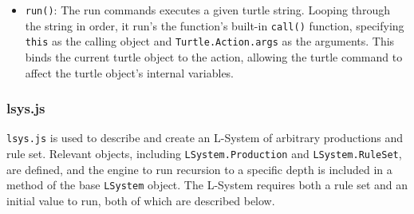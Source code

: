 \documentclass{article}
\newcommand{\tab}{\hspace*{2em}}
\begin{document}
\begin{itemize}
    \item \verb|run()|: The run commands executes a given turtle string. Looping through the string
in order, it run's the function's built-in \verb|call()| function, specifying \verb|this| as the
calling object and \verb|Turtle.Action.args| as the arguments. This binds the current turtle object
to the action, allowing the turtle command to affect the turtle object's internal variables.

\end{itemize}
            \subsubsection{lsys.js}
    \tab \verb|lsys.js| is used to describe and create an L-System of arbitrary
productions and rule set. Relevant objects, including \verb|LSystem.Production| and
\verb|LSystem.RuleSet|, are defined, and the engine to run recursion to a specific depth is
included in a method of the base \verb|LSystem| object. The L-System requires both a rule set and
an initial value to run, both of which are described below.
\end{document}
